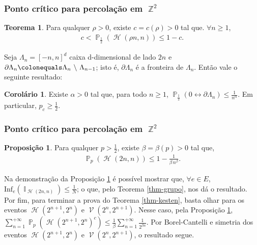 \documentclass[12pt]{beamer}
\theoremstyle{definition} %
\newtheorem{mythm}{Teorema}
\newtheorem{mypro}{Proposição}
\newtheorem{mycol}{Corolário}
\DeclareMathOperator{\PX}{\mathbb{P}} %
\DeclareMathOperator{\ZX}{\mathbb{Z}} %
\DeclareMathOperator{\IX}{\mathbb{I}} %
\DeclareMathOperator{\HC}{\mathcal{H}} %
\DeclareMathOperator{\VC}{\mathcal{V}} %
\begin{document}
	\begin{frame}[t]
		\frametitle{Ponto crítico para percolação em $\ZX^2$}
		\begin{mythm}
			Para qualquer $\rho > 0$, existe $c = c(\rho) > 0$ tal que.  $\forall n \geq 1$,
			\begin{align*}
				c < \PX_{\frac{1}{2}}(\HC(\rho n, n)) \leq 1 - c.
			\end{align*}
		\end{mythm}
		\pause
		Seja $\Lambda_n = [-n, n]^d$ caixa d-dimensional de lado $2n$ e $\partial\Lambda_n \colonequals \Lambda_n \text{~\textbackslash~} \Lambda_{n - 1}$; isto é, $\partial\Lambda_n$ é a fronteira de $\Lambda_n$. Então vale o seguinte resultado:
		\begin{mycol}
			Existe $\alpha > 0$ tal que, para todo $n \geq 1$, $\PX_{\frac{1}{2}}(0 \leftrightarrow \partial\Lambda_n) \leq \frac{1}{n^{\alpha}}$. Em particular, $p_c \geq \frac{1}{2}$.
		\end{mycol}
	\end{frame}

	\begin{frame}[t]
	\frametitle{Ponto crítico para percolação em $\ZX^2$}
		\vspace{-4pt}
		\begin{mypro}
			Para qualquer $p > \frac{1}{2}$, existe $\beta = \beta(p) > 0$ tal que,
			\begin{align*}
			\PX_p(\HC(2n, n)) \leq 1 - \frac{1}{\beta \, n^{\beta}}.
			\end{align*}
			\label{prop-only}
		\end{mypro}
		\vspace{-3pt}
		{\footnotesize
		Na demonstração da Proposição \ref{prop-only} é possível mostrar que, $\forall e \in E$, $\text{Inf}_e(\IX_{\HC(2n, n)}) \leq \frac{1}{N}$; o que, pelo Teorema \ref{thm-grupo}, nos dá o resultado.
		\pause \\ \vspace{9pt}
		Por fim, para terminar a prova do Teorema \ref{thm-kesten}, basta olhar para os eventos $\HC(2^{n + 1}, 2^n)$ e $\VC(2^n, 2^{n + 1})$. Nesse caso, pela Proposição \ref{prop-only}, $\sum_{n = 1}^{+\infty} \PX_p(\HC(2^{n + 1}, 2^n)^c) \leq \frac{1}{\beta}\sum_{n = 1}^{+\infty}\frac{1}{2^{\beta n}}$. Por Borel-Cantelli e simetria dos eventos $\HC(2^{n + 1}, 2^n)$ e $\VC(2^n, 2^{n + 1})$, o resultado segue.}
		
	\end{frame}	
	
\end{document}
